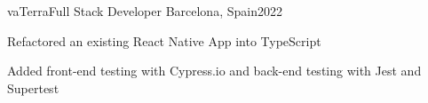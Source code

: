 \resumeProject
  {vaTerra}{Full Stack Developer}
  {Barcelona, Spain}{2022}
  \resumeItemListStart
\item Refactored an existing React Native App into TypeScript
\item Added front-end testing with Cypress.io and back-end testing with Jest and Supertest
  \resumeItemListEnd 